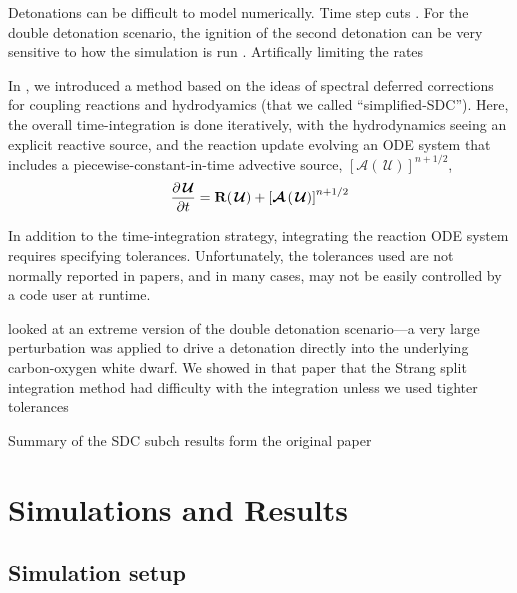 \documentclass[modern]{aastex631}
\newcommand{\ddt}[1]{{\frac{{\partial#1}}{\partial t}}}
\newcommand{\Uc}{{\,\bm{\mathcal{U}}}}
\newcommand{\Rb}{{\bf R}}
\newcommand{\Adv}[1]{{\left [\boldsymbol{\mathcal{A}} \left(#1\right)\right]}}
\newcommand{\MarginPar}[1]{
    \marginpar{\vskip-\baselineskip%
               \raggedright%
               \tiny\sffamily%
               {\color{red}\hrule%
               \smallskip%
               #1\par%
               \smallskip%
               \hrule}}%
}
\begin{document}
Detonations can be difficult to model numerically.  Time step cuts \MarginPar{ref}.
For the double detonation scenario, the ignition of the second detonation
can be very sensitive to how the simulation is run \MarginPar{refs}.
Artifically limiting the rates \MarginPar{ref}

In \citet{castro_simple_sdc}, we introduced a method based on the
ideas of spectral deferred corrections for coupling reactions and
hydrodyamics (that we called ``simplified-SDC'').  Here, the overall
time-integration is done iteratively, with the hydrodynamics seeing an
explicit reactive source, and the reaction update evolving an ODE
system that includes a piecewise-constant-in-time advective source,
$\Adv{\Uc}^{n+1/2}$,
\begin{equation}
\ddt{\Uc} = \Rb(\Uc) + \Adv{\Uc}^{n+1/2}
\end{equation}

In addition to the time-integration strategy, integrating the reaction
ODE system requires specifying tolerances.  Unfortunately, the tolerances
used are not normally reported in papers, and in many cases, may not
be easily controlled by a code user at runtime.



\citet{castro_simple_sdc} looked at an extreme version of the
double detonation scenario---a very large perturbation was applied
to drive a detonation directly into the underlying
carbon-oxygen white dwarf.  We showed in that paper that the Strang
split integration method had difficulty with the integration unless
we used tighter tolerances

Summary of the SDC subch results form the original paper

\section{Simulations and Results}\label{Sec:results}

\subsection{Simulation setup}
\end{document}
